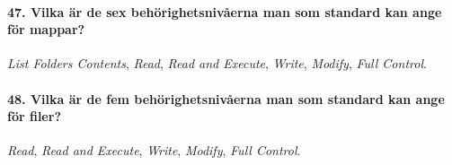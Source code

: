 \paragraph{47. Vilka är de sex behörighetsnivåerna man som standard kan ange för mappar?}
\textit{List Folders Contents}, \textit{Read}, \textit{Read and Execute}, \textit{Write}, \textit{Modify}, \textit{Full Control}. 

\paragraph{48. Vilka är de fem behörighetsnivåerna man som standard kan ange för filer?}
\textit{Read}, \textit{Read and Execute}, \textit{Write}, \textit{Modify}, \textit{Full Control}. 















